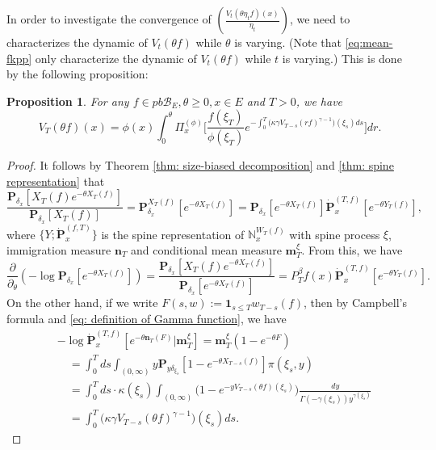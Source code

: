 \documentclass[12pt, a4paper]{amsart}
\newtheorem{prop}[thm]{Proposition}
\theoremstyle{definition}
\numberwithin{equation}{section}
\begin{document}
	In order to investigate the convergence of $(\frac{ V_t(\theta \eta_t f)(x)}{\eta_t})$, we need to characterizes the dynamic of $V_t(\theta f)$ while $\theta$ is varying.
	(Note that \eqref{eq:mean-fkpp} only characterize the dynamic of $V_t(\theta f)$ while $t$ is varying.)
	This is done by the following proposition:

\begin{prop}
	For any $f\in pb\mathscr B_E,\theta \geq 0,x\in E$ and $T>0$, we have
\[\label{eq: equation for Vt(theta f) for theta}
	V_T ( \theta f) ( x)
	= \phi( x) \int_0^\theta \Pi_x^{(\phi)} \Big[ \frac{ f(\xi_T) } { \phi(\xi_T) } e^{ - \int_0^T \big( \kappa \gamma V_{T-s} (r f)^{ \gamma - 1} \big) ( \xi_s) ds} \Big] dr.
\]
\end{prop}

\begin{proof}
	It follows by Theorem \ref{thm: size-biased decomposition} and \ref{thm: spine representation} that
\[
	\frac{ \mathbf P_{\delta_x}[X_T(f)e^{-\theta X_T(f)}] } {  \mathbf P_{\delta_x} [X_T(f)] }
	= \mathbf P_{\delta_x}^{X_T(f)} [e^{-\theta X_T(f)}]
	= \mathbf P_{\delta_x} [e^{-\theta X_T(f)}] \dot {\mathbf P}_x^{(T,f)}[e^{-\theta Y_T(f)}],
\]
	where $\{Y; \dot {\mathbf P}^{(f,T)}_x\}$ is the spine representation of $\mathbb N^{W_T(f)}_x$ with spine process $\xi$, 
immigration measure
	$\mathbf n_T$ and 
conditional mean measure
	$\mathbf m^\xi_T$.
	From this, we have
\[ \label{eq: dynamic of theta on v_t theta reason 1}
	\frac{\partial}{\partial_\theta}
	(-\log \mathbf P_{\delta_x}[e^{-\theta X_T(f)}])
	= \frac{\mathbf P_{\delta_x}[X_T(f)e^{-\theta X_T(f)}]}{\mathbf P_{\delta_x}[e^{-\theta X_T(f)}]}
	= P^\beta_T f(x) \dot {\mathbf P}_x^{(T,f)}[e^{-\theta Y_T(f)}].
\]
	On the other hand, if we write $F(s,w):= \mathbf 1_{s\leq T} w_{T-s}(f)$, then by Campbell's formula and \eqref{eq: definition of Gamma function}, we have
\[\label{eq: dynamic of theta on v_t theta reason 2}\begin{split}
	&-\log \dot {\mathbf P}^{(T,f)}_{x}[e^{-\theta \mathbf n_T(F)}|\mathbf m_T^\xi]
	= \mathbf m_T^\xi(1-e^{-\theta F})
	\\&\quad = \int_0^T ds \int_{(0,\infty)} y \mathbf P_{y\delta_{\xi_s}}[1- e^{-\theta X_{T-s}(f)}] \pi(\xi_s,y)
	\\&\quad = \int_0^T ds \cdot \kappa(\xi_s) \int_{(0,\infty)} \mathbf (1- e^{- y V_{T-s}(\theta f)(\xi_s)}) \frac{dy}{\Gamma(-\gamma(\xi_s)) y^{\gamma(\xi_s)}}
	\\&\quad = \int_0^T \big(\kappa\gamma V_{T-s}(\theta f)^{\gamma-1}\big)(\xi_s) ds.

\end{split}\]
\end{proof}
\end{document}

